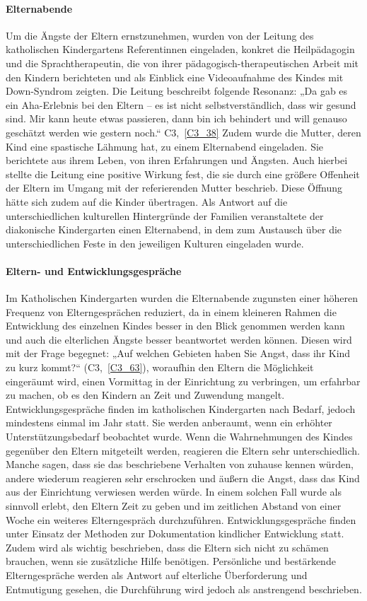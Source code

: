 \paragraph{Elternabende}
Um die Ängste der Eltern ernstzunehmen, wurden von der Leitung des katholischen Kindergartens Referentinnen eingeladen, konkret die Heilpädagogin und die  Sprachtherapeutin, die von ihrer pädagogisch-therapeutischen Arbeit mit den Kindern berichteten und als Einblick eine Videoaufnahme des Kindes mit Down-Syndrom  zeigten. Die Leitung beschreibt folgende Resonanz: „Da gab es ein Aha-Erlebnis bei den Eltern -- es ist nicht selbstverständlich, dass wir gesund sind. Mir kann heute etwas passieren, dann bin ich behindert und will genauso geschätzt werden wie gestern noch.“ C3,~\ref{C3_38} Zudem wurde die Mutter, deren Kind eine spastische Lähmung hat, zu einem Elternabend eingeladen. Sie berichtete aus ihrem Leben, von ihren Erfahrungen und Ängsten. Auch hierbei stellte die Leitung eine positive Wirkung fest, die sie durch eine größere Offenheit der Eltern im Umgang mit der referierenden Mutter beschrieb. Diese Öffnung hätte sich zudem auf die Kinder übertragen. 
Als Antwort auf die unterschiedlichen kulturellen Hintergründe der Familien veranstaltete der diakonische Kindergarten einen Elternabend, in dem zum Austausch über die unterschiedlichen Feste in den jeweiligen Kulturen eingeladen wurde. 

\paragraph{Eltern- und Entwicklungsgespräche}
Im Katholischen Kindergarten wurden die Elternabende zugunsten einer höheren Frequenz von Elterngesprächen reduziert, da in einem kleineren Rahmen die Entwicklung des einzelnen Kindes besser in den Blick genommen werden kann und auch die elterlichen Ängste besser beantwortet werden können. Diesen wird mit der Frage begegnet: „Auf welchen Gebieten haben Sie Angst, dass ihr Kind zu kurz kommt?“ (C3,~\ref{C3_63}), woraufhin den Eltern die Möglichkeit eingeräumt wird, einen Vormittag in der Einrichtung zu verbringen, um erfahrbar zu machen, ob es den Kindern an Zeit und Zuwendung mangelt. 
Entwicklungsgespräche finden im katholischen Kindergarten nach Bedarf, jedoch mindestens einmal im Jahr statt. Sie werden anberaumt, wenn ein erhöhter Unterstützungsbedarf beobachtet wurde. Wenn die Wahrnehmungen des Kindes gegenüber den Eltern mitgeteilt werden, reagieren die Eltern sehr unterschiedlich. Manche sagen, dass sie das beschriebene Verhalten von zuhause kennen würden, andere wiederum reagieren sehr erschrocken und äußern die Angst, dass das Kind aus der Einrichtung verwiesen werden würde. In einem solchen Fall wurde als sinnvoll erlebt, den Eltern Zeit zu geben und im zeitlichen Abstand von einer Woche ein weiteres Elterngespräch durchzuführen. Entwicklungsgespräche finden unter Einsatz der Methoden zur Dokumentation kindlicher Entwicklung statt. 
Zudem wird als wichtig beschrieben, dass die Eltern sich nicht zu schämen brauchen, wenn sie zusätzliche Hilfe benötigen. Persönliche und bestärkende Elterngespräche werden als Antwort auf elterliche Überforderung und Entmutigung gesehen, die Durchführung wird jedoch als anstrengend beschrieben. 

